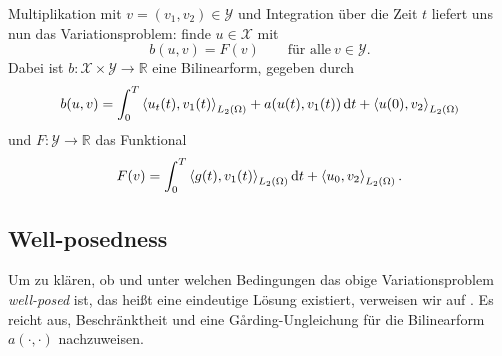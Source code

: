 Multiplikation mit $v = (v_{1}, v_{2}) \in \mathcal Y$ und Integration über die Zeit $t$ liefert uns nun das Variationsproblem: finde $u \in \mathcal X$ mit
\begin{equation}
     b(u, v) = F(v) \qquad \text{für alle}~v \in \mathcal Y.
\end{equation}
Dabei ist $b \colon \mathcal X \times \mathcal Y \to \mathbb{R}$ eine Bilinearform, gegeben durch
\begin{equation}
    b(u, v) = \int_{0}^{T} \left\langle u_{t}(t),v_{1}(t)\right\rangle_{L_{2}(\Omega)} + a(u(t), v_{1}(t)) \mathop{}\!\mathrm{d} t + \left\langle u(0),v_{2}\right\rangle_{L_{2}(\Omega)}
\end{equation}
und $F \colon \mathcal Y \to \mathbb{R}$ das Funktional
\begin{equation}
    F(v) = \int_{0}^{T} \left\langle g(t),v_{1}(t)\right\rangle_{L_{2}(\Omega)} \mathop{}\!\mathrm{d} t + \left\langle u_{0},v_{2}\right\rangle_{L_{2}(\Omega)}.
\end{equation}


\subsection{Well-posedness} %
\label{ssub:well_posedness}
Um zu klären, ob und unter welchen Bedingungen das obige Variationsproblem \emph{well-posed} ist, das heißt eine eindeutige Lösung existiert, verweisen wir auf \cite{Schwab:2009ec}.
Es reicht aus, Beschränktheit und eine G\aa{}rding-Ungleichung für die Bilinearform $a(\cdot, \cdot)$ nachzuweisen.

